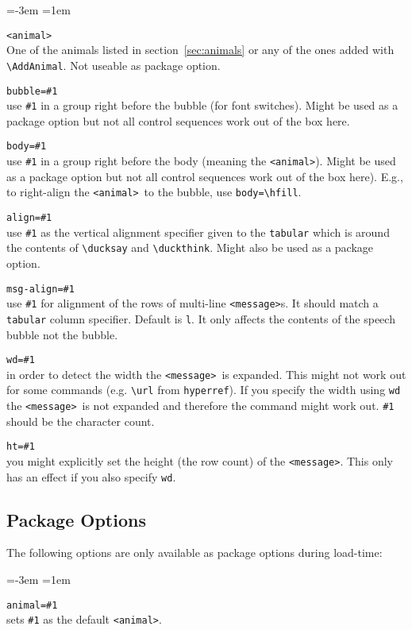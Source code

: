 \documentclass[a4paper,10pt]{article}
\newcommand*{\anml}{\texttt{<animal>}}
\newcommand*{\msg}{\texttt{<message>}}
\newenvironment{codedescription}{%
  \parindent=-3em%
  \parskip=1em%
  \par%
}{}
\begin{document}
\begin{codedescription}
\anml\\
  One of the animals listed in section~\ref{sec:animals} or any of the ones
  added with \verb|\AddAnimal|. Not useable as package option.

\texttt{bubble=\#1}\\
  use \texttt{\#1} in a group right before the bubble (for font switches). Might
  be used as a package option but not all control sequences work out of the box
  here.

\texttt{body=\#1}\\
  use \texttt{\#1} in a group right before the body (meaning the \anml). Might
  be used as a package option but not all control sequences work out of the box
  here). E.g., to right-align the \anml\ to the bubble, use \verb|body=\hfill|.

\texttt{align=\#1}\\
  use \texttt{\#1} as the vertical alignment specifier given to the
  \texttt{tabular} which is around the contents of \verb|\ducksay| and
  \verb|\duckthink|. Might also be used as a package option.

\texttt{msg-align=\#1}\\
  use \texttt{\#1} for alignment of the rows of multi-line \msg s. It should
  match a \texttt{tabular} column specifier. Default is \texttt{l}. It only
  affects the contents of the speech bubble not the bubble.

\texttt{wd=\#1}\\
  in order to detect the width the \msg\ is expanded. This might not work out
  for some commands (e.g. \verb|\url| from \texttt{hyperref}). If you specify
  the width using \texttt{wd} the \msg\ is not expanded and therefore the
  command might work out. \texttt{\#1} should be the character count.

\texttt{ht=\#1}\\
  you might explicitly set the height (the row count) of the \msg. This only has
  an effect if you also specify \texttt{wd}.
\end{codedescription}
\subsection{Package Options}%
The following options are only available as package options during load-time:

\begin{codedescription}
\texttt{animal=\#1}\\
  sets \texttt{\#1} as the default \anml.
\end{codedescription}
\end{document}
